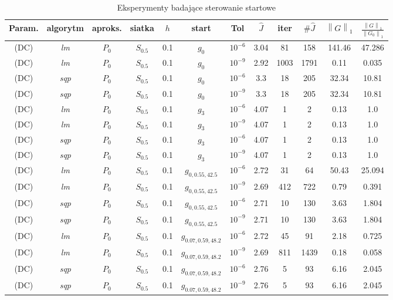 \documentclass[11pt]{article}
\newcommand{\norm}[1]{\left\lVert#1\right\rVert}
\begin{document}
\begin{table}[h]
  \begin{center}
    \begin{tabular}{|c|c|c|c|c|c|c||c|c|c|c|c|}
      \hline
      Param. & algorytm & aproks. & siatka & $h$ & start & Tol & $\hat{J}$ & iter & $\#\hat{J}$ & $\norm{G}_1$ & $\frac{\norm{G}_1}{\norm{G_0}_1}$ \\
      \hline
      (DC) & {\it lm\/} & $P_0$ & $S_{0.5}$ & 0.1 & $g_0$ & $10^{-6}$ & 3.04 & 81 & 158 & 141.46 & 47.286 \\
      \hline
      (DC) & {\it lm\/} & $P_0$ & $S_{0.5}$ & 0.1 & $g_0$ & $10^{-9}$ & 2.92 & 1003 & 1791 & 0.11 & 0.035 \\
      \hline
      (DC) & {\it sqp\/} & $P_0$ & $S_{0.5}$ & 0.1 & $g_0$ & $10^{-6}$ & 3.3 & 18 & 205 & 32.34 & 10.81 \\
      \hline
      (DC) & {\it sqp\/} & $P_0$ & $S_{0.5}$ & 0.1 & $g_0$ & $10^{-9}$ & 3.3 & 18 & 205 & 32.34 & 10.81 \\
      \hline
      (DC) & {\it lm\/} & $P_0$ & $S_{0.5}$ & 0.1 & $g_3$ & $10^{-6}$ & 4.07 & 1 & 2 & 0.13 & 1.0 \\
      \hline
      (DC) & {\it lm\/} & $P_0$ & $S_{0.5}$ & 0.1 & $g_3$ & $10^{-9}$ & 4.07 & 1 & 2 & 0.13 & 1.0 \\
      \hline
      (DC) & {\it sqp\/} & $P_0$ & $S_{0.5}$ & 0.1 & $g_3$ & $10^{-6}$ & 4.07 & 1 & 2 & 0.13 & 1.0 \\
      \hline
      (DC) & {\it sqp\/} & $P_0$ & $S_{0.5}$ & 0.1 & $g_3$ & $10^{-9}$ & 4.07 & 1 & 2 & 0.13 & 1.0 \\
      \hline
      (DC) & {\it lm\/} & $P_0$ & $S_{0.5}$ & 0.1 & $g_{0,0.55,42.5}$ & $10^{-6}$ & 2.72 & 31 & 64 & 50.43 & 25.094 \\
      \hline
      (DC) & {\it lm\/} & $P_0$ & $S_{0.5}$ & 0.1 & $g_{0,0.55,42.5}$ & $10^{-9}$ & 2.69 & 412 & 722 & 0.79 & 0.391 \\
      \hline
      (DC) & {\it sqp\/} & $P_0$ & $S_{0.5}$ & 0.1 & $g_{0,0.55,42.5}$ & $10^{-6}$ & 2.71 & 10 & 130 & 3.63 & 1.804 \\
      \hline
      (DC) & {\it sqp\/} & $P_0$ & $S_{0.5}$ & 0.1 & $g_{0,0.55,42.5}$ & $10^{-9}$ & 2.71 & 10 & 130 & 3.63 & 1.804 \\
      \hline
      (DC) & {\it lm\/} & $P_0$ & $S_{0.5}$ & 0.1 & $g_{0.07,0.59,48.2}$ & $10^{-6}$ & 2.72 & 45 & 91 & 2.18 & 0.725 \\
      \hline
      (DC) & {\it lm\/} & $P_0$ & $S_{0.5}$ & 0.1 & $g_{0.07,0.59,48.2}$ & $10^{-9}$ & 2.69 & 811 & 1439 & 0.18 & 0.058 \\
      \hline
      (DC) & {\it sqp\/} & $P_0$ & $S_{0.5}$ & 0.1 & $g_{0.07,0.59,48.2}$ & $10^{-6}$ & 2.76 & 5 & 93 & 6.16 & 2.045 \\
      \hline
      (DC) & {\it sqp\/} & $P_0$ & $S_{0.5}$ & 0.1 & $g_{0.07,0.59,48.2}$ & $10^{-9}$ & 2.76 & 5 & 93 & 6.16 & 2.045 \\
      \hline
    \end{tabular}
    \caption{Eksperymenty badające sterowanie startowe}\label{start_tbl}
  \end{center}
\end{table}
\end{document}
